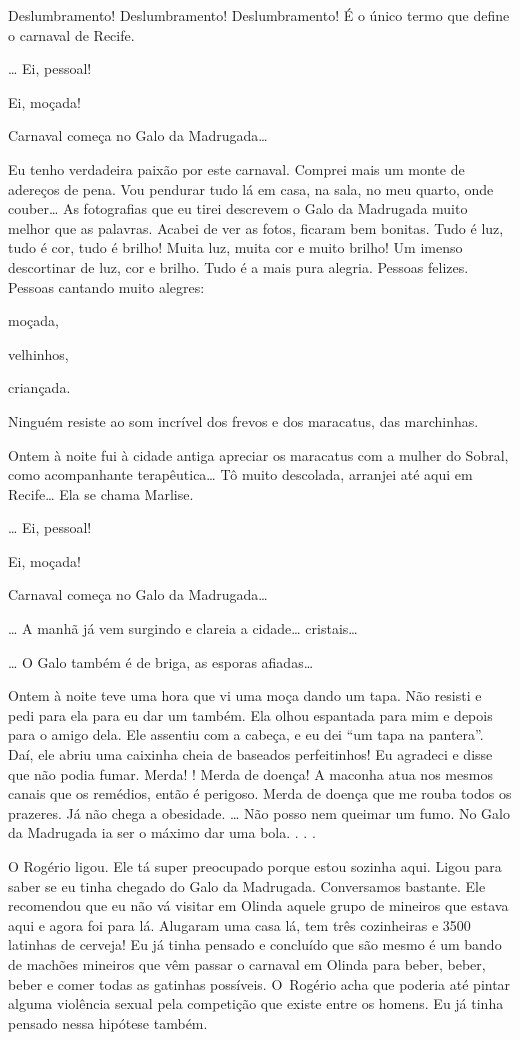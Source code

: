Deslumbramento! Deslumbramento! Deslumbramento! É o único termo que
define o carnaval de Recife.

… Ei, pessoal!

Ei, moçada!

Carnaval começa no Galo da Madrugada…

Eu tenho verdadeira paixão por este carnaval. Comprei mais um monte de
adereços de pena. Vou pendurar tudo lá em casa, na sala, no meu quarto,
onde couber… As fotografias que eu tirei descrevem o Galo da
Madrugada muito melhor que as palavras. Acabei de ver as fotos, ficaram
bem bonitas. Tudo é luz, tudo é cor, tudo é brilho! Muita luz, muita cor
e muito brilho! Um imenso descortinar de luz, cor e brilho. Tudo é a
mais pura alegria. Pessoas felizes. Pessoas cantando muito alegres:

moçada,

velhinhos,

criançada.

Ninguém resiste ao som incrível dos frevos e dos maracatus, das
marchinhas.

Ontem à noite fui à cidade antiga apreciar os maracatus com a mulher do
Sobral, como acompanhante terapêutica… Tô muito descolada,
arranjei até  aqui em Recife… Ela se chama Marlise.

… Ei, pessoal!

Ei, moçada!

Carnaval começa no Galo da Madrugada…

… A manhã já vem surgindo e clareia a cidade…
cristais…

… O Galo também é de briga, as esporas afiadas…

Ontem à noite teve uma hora que vi uma moça dando um tapa. Não resisti e
pedi para ela para eu dar um também. Ela olhou espantada para mim e
depois para o amigo dela. Ele assentiu com a cabeça, e eu dei ``um tapa
na pantera''. Daí, ele abriu uma caixinha cheia de baseados
perfeitinhos! Eu agradeci e disse que não podia fumar. Merda! !
Merda de doença! A maconha atua nos mesmos canais que os remédios, então
é perigoso. Merda de doença que me rouba todos os prazeres. Já não chega
a obesidade. … Não posso nem queimar um fumo. No Galo da
Madrugada ia ser o máximo dar uma bola. . . .

O Rogério ligou. Ele tá super preocupado porque estou sozinha aqui.
Ligou para saber se eu tinha chegado do Galo da Madrugada. Conversamos
bastante. Ele recomendou que eu não vá visitar em Olinda aquele grupo de
mineiros que estava aqui e agora foi para lá. Alugaram uma casa lá, tem
três cozinheiras e 3500 latinhas de cerveja! Eu já tinha pensado e
concluído que são mesmo é um bando de machões mineiros que vêm passar o
carnaval em Olinda para beber, beber, beber e comer todas as gatinhas
possíveis. O~Rogério acha que poderia até pintar alguma violência sexual
pela competição que existe entre os homens. Eu já tinha pensado nessa
hipótese também.

